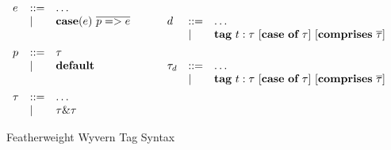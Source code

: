 \begin{figure}
\centering
\[
\begin{array}{lll}

e    & \bnfdef & \ldots \\
     & \bnfalt & \keyw{case}(e)~ \overline{p => e} \\ %
\\[1ex]

p    & \bnfdef & \tau \\
     & \bnfalt & \keyw{default} \\
\\[1ex]

\tau & \bnfdef & \ldots\\
     & \bnfalt & \tau \& \tau\\		%
	 
\end{array}
\begin{array}{lll}
~~~~
\end{array}
\begin{array}{lll}
	 
d    & \bnfdef & \ldots\\
     & \bnfalt & \keyw{tag}~ t:\tau ~ [\keyw{case}~\keyw{of}~\tau] ~ [\keyw{comprises}~ \overline{\tau}] \\
\\[1ex]

\tau_d & \bnfdef & \ldots \\
       & \bnfalt & \keyw{tag}~ t:\tau ~ [\keyw{case}~\keyw{of}~\tau] ~ [\keyw{comprises}~ \overline{\tau}] \\
\\[1ex]

\end{array}
\]
\caption{Featherweight Wyvern Tag Syntax}
\label{fig:tag-syntax}
\end{figure}


